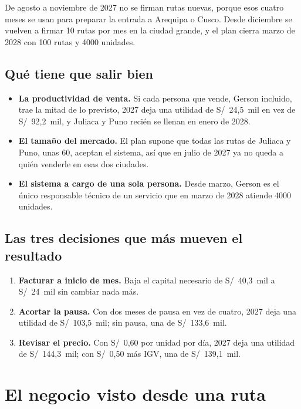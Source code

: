\documentclass[10.5pt,a4paper]{article}
\begin{document}
De agosto a noviembre de 2027 no se firman rutas nuevas, porque esos cuatro meses se usan para preparar la entrada a Arequipa o Cusco. Desde diciembre se vuelven a firmar 10 rutas por mes en la ciudad grande, y el plan cierra marzo de 2028 con 100 rutas y 4000 unidades.

\subsection{Qué tiene que salir bien}

\begin{itemize}
\item \textbf{La productividad de venta.} Si cada persona que vende, Gerson incluido, trae la mitad de lo previsto, 2027 deja una utilidad de S/~24,5~mil en vez de S/~92,2~mil, y Juliaca y Puno recién se llenan en enero de 2028.
\item \textbf{El tamaño del mercado.} El plan supone que todas las rutas de Juliaca y Puno, unas 60, aceptan el sistema, así que en julio de 2027 ya no queda a quién venderle en esas dos ciudades.
\item \textbf{El sistema a cargo de una sola persona.} Desde marzo, Gerson es el único responsable técnico de un servicio que en marzo de 2028 atiende 4000 unidades.
\end{itemize}

\subsection{Las tres decisiones que más mueven el resultado}

\begin{enumerate}
\item \textbf{Facturar a inicio de mes.} Baja el capital necesario de S/~40,3~mil a S/~24~mil sin cambiar nada más.
\item \textbf{Acortar la pausa.} Con dos meses de pausa en vez de cuatro, 2027 deja una utilidad de S/~103,5~mil; sin pausa, una de S/~133,6~mil.
\item \textbf{Revisar el precio.} Con S/~0,60 por unidad por día, 2027 deja una utilidad de S/~144,3~mil; con S/~0,50 más IGV, una de S/~139,1~mil.
\end{enumerate}

\section{El negocio visto desde una ruta}
\end{document}
